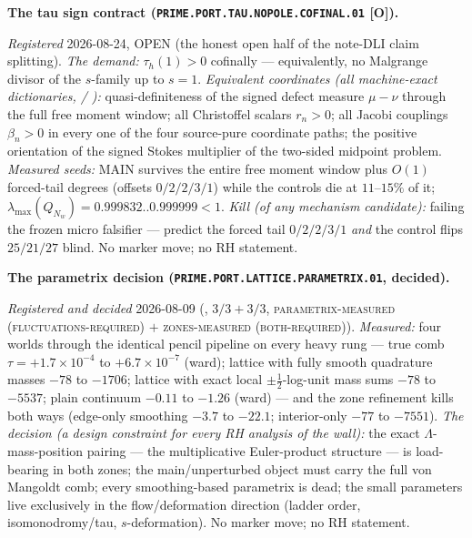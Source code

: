 \par\smallskip\noindent\textbf{The tau sign contract
(\texttt{PRIME.PORT.TAU.NOPOLE.\allowbreak COFINAL.01} [O]).}
{\sloppy
\emph{Registered} 2026-08-24, OPEN (the honest open half of the
note-DLI claim splitting).  \emph{The demand:} $\tau_h(1) > 0$
cofinally --- equivalently, no Malgrange divisor of the
$s$-family up to $s = 1$.  \emph{Equivalent coordinates (all
machine-exact dictionaries,
 /
):}
quasi-definiteness of the signed defect measure $\mu - \nu$
through the full free moment window; all Christoffel scalars
$r_n > 0$; all Jacobi couplings $\beta_n > 0$ in every one of
the four source-pure coordinate paths; the positive orientation
of the signed Stokes multiplier of the two-sided midpoint
problem.  \emph{Measured seeds:} MAIN survives the entire free
moment window plus $O(1)$ forced-tail degrees (offsets
$0/2/2/3/1$) while the controls die at $11$--$15\%$ of it;
$\lambda_{\max}(Q_{N_w}) = 0.999832..0.999999 < 1$.  \emph{Kill
(of any mechanism candidate):} failing the frozen micro
falsifier --- predict the forced tail $0/2/2/3/1$ \emph{and} the
control flips $25/21/27$ blind.  No marker move; no RH
statement.\par}


\par\smallskip\noindent\textbf{The parametrix decision
(\texttt{PRIME.PORT.LATTICE.\allowbreak PARAMETRIX.01},
decided).}
{\sloppy
\emph{Registered and decided} 2026-08-09
(, $3/3 + 3/3$,
\textsc{parametrix-measured (fluctuations-required)} $+$
\textsc{zones-measured (both-required)}).  \emph{Measured:}
four worlds through the identical pencil pipeline on every heavy
rung --- true comb $\tau = +1.7\times10^{-4}$ to
$+6.7\times10^{-7}$ (ward); lattice with fully smooth quadrature
masses $-78$ to $-1706$; lattice with exact local
$\pm\tfrac12$-log-unit mass sums $-78$ to $-5537$; plain
continuum $-0.11$ to $-1.26$ (ward) --- and the zone refinement
kills both ways (edge-only smoothing $-3.7$ to $-22.1$;
interior-only $-77$ to $-7551$).  \emph{The decision (a design
constraint for every RH analysis of the wall):} the exact
$\Lambda$-mass-position pairing --- the multiplicative
Euler-product structure --- is load-bearing in both zones; the
main/unperturbed object must carry the full von Mangoldt comb;
every smoothing-based parametrix is dead; the small parameters
live exclusively in the flow/deformation direction (ladder
order, isomonodromy/tau, $s$-deformation).  No marker move; no
RH statement.\par}


